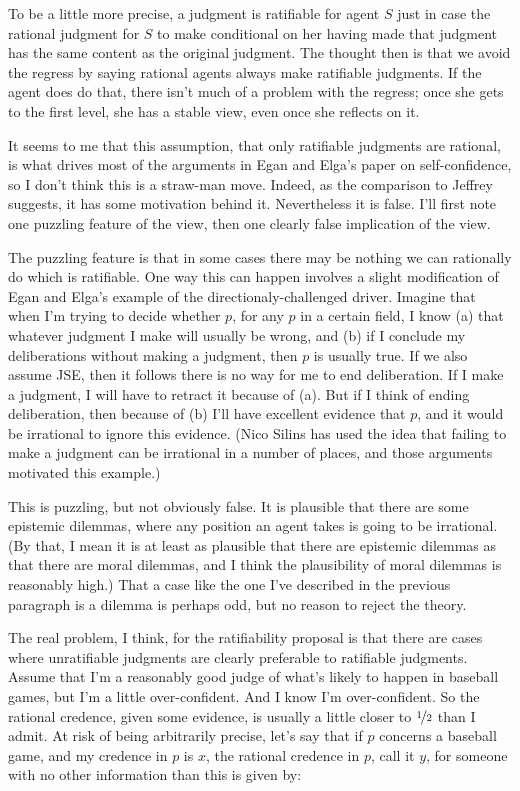 To be a little more precise, a judgment is ratifiable for agent \(S\) just in case the rational judgment for \(S\) to make conditional on her having made that judgment has the same content as the original judgment. The thought then is that we avoid the regress by saying rational agents always make ratifiable judgments. If the agent does do that, there isn't much of a problem with the regress; once she gets to the first level, she has a stable view, even once she reflects on it. 

It seems to me that this assumption, that only ratifiable judgments are rational, is what drives most of the arguments in Egan and Elga's paper on self-confidence, so I don't think this is a straw-man move. Indeed, as the comparison to Jeffrey suggests, it has some motivation behind it. Nevertheless it is false. I'll first note one puzzling feature of the view, then one clearly false implication of the view.

The puzzling feature is that in some cases there may be nothing we can rationally do which is ratifiable. One way this can happen involves a slight modification of Egan and Elga's example of the directionaly-challenged driver. Imagine that when I'm trying to decide whether \(p\), for any \(p\) in a certain field, I know (a) that whatever judgment I make will usually be wrong, and (b) if I conclude my deliberations without making a judgment, then \(p\) is usually true. If we also assume JSE, then it follows there is no way for me to end deliberation. If I make a judgment, I will have to retract it because of (a). But if I think of ending deliberation, then because of (b) I'll have excellent evidence that \(p\), and it would be irrational to ignore this evidence. (Nico Silins has used the idea that failing to make a judgment can be irrational in a number of places, and those arguments motivated this example.)

This is puzzling, but not obviously false. It is plausible that there are some epistemic dilemmas, where any position an agent takes is going to be irrational. (By that, I mean it is at least as plausible that there are epistemic dilemmas as that there are moral dilemmas, and I think the plausibility of moral dilemmas is reasonably high.) That a case like the one I've described in the previous paragraph is a dilemma is perhaps odd, but no reason to reject the theory.

The real problem, I think, for the ratifiability proposal is that there are cases where unratifiable judgments are clearly preferable to ratifiable judgments. Assume that I'm a reasonably good judge of what's likely to happen in baseball games, but I'm a little over-confident. And I know I'm over-confident. So the rational credence, given some evidence, is usually a little closer to \(\nicefrac{1}{2}\) than I admit. At risk of being arbitrarily precise, let's say that if \(p\) concerns a baseball game, and my credence in \(p\) is \(x\), the rational credence in \(p\), call it \(y\), for someone with no other information than this is given by:

